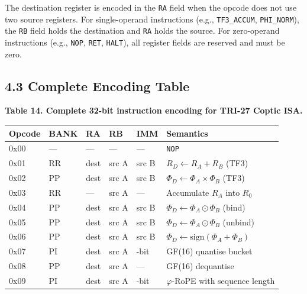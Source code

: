 The destination register is encoded in the \texttt{RA} field
when the opcode does not use two source registers. For
single-operand instructions (e.g., \texttt{TF3\_ACCUM},
\texttt{PHI\_NORM}), the \texttt{RB} field holds the destination
and \texttt{RA} holds the source. For zero-operand instructions
(e.g., \texttt{NOP}, \texttt{RET}, \texttt{HALT}), all register
fields are reserved and must be zero.

\subsection{4.3 Complete Encoding Table}\label{fa_71:encoding-table}

\textbf{Table 14. Complete 32-bit instruction encoding for TRI-27 Coptic ISA.}

\begin{longtable}[]{@{}
  >{\raggedright\arraybackslash}p{}
  >{\raggedright\arraybackslash}p{}
  >{\raggedright\arraybackslash}p{}
  >{\raggedright\arraybackslash}p{}
  >{\raggedright\arraybackslash}p{}
  >{\raggedright\arraybackslash}p{}@{}}
\toprule\noalign{}
Opcode & BANK & RA & RB & IMM & Semantics \\
\midrule\noalign{}
\endhead
\bottomrule\noalign{}
\endlastfoot
0x00 & --- & --- & --- & --- & \texttt{NOP} \\
0x01 & RR & dest & src A & src B & \(R_D \leftarrow R_A + R_B\) (TF3) \\
0x02 & PP & dest & src A & src B & \(\Phi_D \leftarrow \Phi_A \times \Phi_B\) (TF3) \\
0x03 & RR & --- & src A & --- & Accumulate \(R_A\) into \(R_0\) \\
0x04 & PP & dest & src A & src B & \(\Phi_D \leftarrow \Phi_A \odot \Phi_B\) (bind) \\
0x05 & PP & dest & src A & src B & \(\Phi_D \leftarrow \Phi_A \odot \Phi_B\) (unbind) \\
0x06 & PP & dest & src A & src B & \(\Phi_D \leftarrow \text{sign}(\Phi_A + \Phi_B)\) \\
0x07 & PI & dest & src A & 4-bit & GF(16) quantise bucket \\
0x08 & PP & dest & src A & --- & GF(16) dequantise \\
0x09 & PI & dest & src A & 13-bit & \(\varphi\)-RoPE with sequence length \\

\end{longtable}
